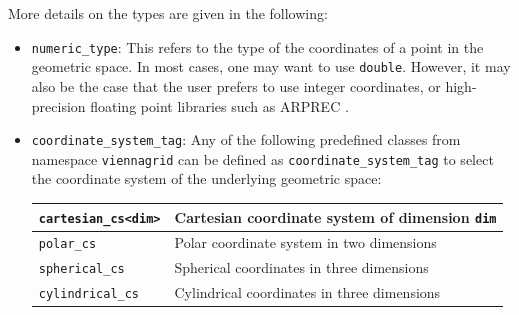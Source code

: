 More details on the types are given in the following:
\begin{itemize}
 \item \lstinline|numeric_type|: This refers to the type of the coordinates of a point in the geometric space. In most cases, one may want to use \lstinline|double|. However, it may also be the case that the user prefers to use integer coordinates, or high-precision floating point libraries such as ARPREC \cite{arprec}.

 \item \lstinline|coordinate_system_tag|: Any of the following predefined classes from namespace \lstinline|viennagrid| can be defined as \lstinline|coordinate_system_tag| to select the coordinate system of the underlying geometric space:
   \begin{center}
   \begin{tabular}{|l|l|}
    \hline
    \lstinline|cartesian_cs<dim>|   &  Cartesian coordinate system of dimension \lstinline|dim| \\
    \hline
    \lstinline|polar_cs|       &  Polar coordinate system in two dimensions \\
    \hline
    \lstinline|spherical_cs|   &  Spherical coordinates in three dimensions \\
    \hline
    \lstinline|cylindrical_cs| &  Cylindrical coordinates in three dimensions \\
    \hline
   \end{tabular}
   \end{center}


\end{itemize}
